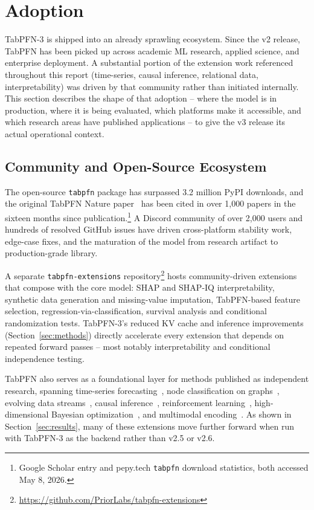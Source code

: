 \section{Adoption} \label{sec:usecases_extensions}

TabPFN-3 is shipped into an already sprawling ecosystem. Since the v2 release, TabPFN has been picked up across academic ML research, applied science, and enterprise deployment. A substantial portion of the extension work referenced throughout this report (time-series, causal inference, relational data, interpretability) was driven by that community rather than initiated internally. This section describes the shape of that adoption -- where the model is in production, where it is being evaluated, which platforms make it accessible, and which research areas have published applications -- to give the v3 release its actual operational context.

\subsection{Community and Open-Source Ecosystem}

The open-source \texttt{tabpfn} package has surpassed 3.2 million PyPI downloads, and the original TabPFN Nature paper~\citep{Hollmann2025tabpfnv2} has been cited in over 1{,}000 papers in the sixteen months since publication.\footnote{Google Scholar entry and pepy.tech \texttt{tabpfn} download statistics, both accessed May 8, 2026.} A Discord community of over 2{,}000 users and hundreds of resolved GitHub issues have driven cross-platform stability work, edge-case fixes, and the maturation of the model from research artifact to production-grade library.

A separate \texttt{tabpfn-extensions} repository\footnote{\url{https://github.com/PriorLabs/tabpfn-extensions}} hosts community-driven extensions that compose with the core model: SHAP and SHAP-IQ interpretability, synthetic data generation and missing-value imputation, TabPFN-based feature selection, regression-via-classification, survival analysis and conditional randomization tests. TabPFN-3's reduced KV cache and inference improvements (Section~\ref{sec:methods}) directly accelerate every extension that depends on repeated forward passes -- most notably interpretability and conditional independence testing.

TabPFN also serves as a foundational layer for methods published as independent research, spanning time-series forecasting~\citep{hoo2024tabpfn_ts}, node classification on graphs~\citep{Hayler2025GraphsTablesZeroShot, eremeev2025turningtabularfoundationmodels}, evolving data streams~\citep{Lourenco2025ICLStreams}, causal inference~\citep{robertson_dopfn, balazadeh_causalpfn, feuerriegel_causalfm}, reinforcement learning~\citep{Schiff2025TabPFNRL}, high-dimensional Bayesian optimization~\citep{Yu2025GITBO}, and multimodal encoding~\citep{luo2025timetabpfnintegratedmultimodalengine}. As shown in Section~\ref{sec:results}, many of these extensions move further forward when run with TabPFN-3 as the backend rather than v2.5 or v2.6.

